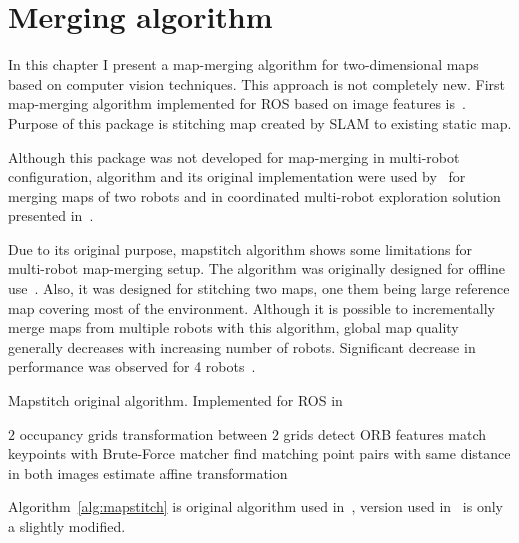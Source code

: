 \chapter{Merging algorithm}
\label{chap:mergingalgorithm}

In this chapter I present a map-merging algorithm for two-dimensional maps based on computer vision techniques. This approach is not completely new. First map-merging algorithm implemented for \gls{ROS} based on image features is~\cite{MapstitchROS}. Purpose of this package is stitching map created by \gls{SLAM} to existing static map.

Although this package was not developed for map-merging in multi-robot configuration, algorithm and its original implementation were used by~\cite{martins2013mrslam} for merging maps of two robots and in coordinated multi-robot exploration solution presented in~\cite{Andre2014}.

Due to its original purpose, mapstitch algorithm shows some limitations for multi-robot map-merging setup. The algorithm was originally designed for offline use~\cite{Andre2014}. Also, it was designed for stitching two maps, one them being large reference map covering most of the environment. Although it is possible to incrementally merge maps from multiple robots with this algorithm, global map quality generally decreases with increasing number of robots. Significant decrease in performance was observed for 4 robots~\cite{Andre2014}.

\begin{algorithm}
    \caption[Mapstitch algorithm.]{Mapstitch original algorithm. Implemented for \gls{ROS} in~\cite{MapstitchROS}}
    \label{alg:mapstitch}
    \begin{algorithmic}[1]
        \Require $2$ occupancy grids
        \Ensure transformation between $2$ grids
            \State detect \gls{ORB} features
            \State match keypoints with Brute-Force matcher
            \State find matching point pairs with same distance in both images
            \State estimate affine transformation
        \EndProcedure
    \end{algorithmic}
\end{algorithm}

Algorithm~\ref{alg:mapstitch} is original algorithm used in~\cite{MapstitchROS}, version used in~\cite{Andre2014} is only a slightly modified.

